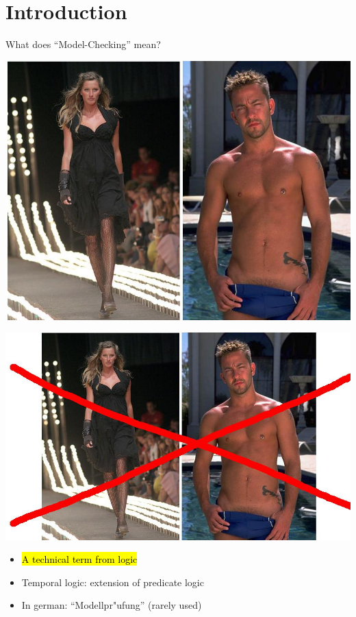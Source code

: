 
\section{Introduction}

\begin{frame}{What does ``Model-Checking'' mean?}
 {
  \centerline{\includegraphics[width=.8\textwidth]{content/chapter_model_checking/model_checking/images/models}}
}

 {
  \centerline{\includegraphics[width=\textwidth]{content/chapter_model_checking/model_checking/images/models1}}
}

 {
  \begin{itemize}
    \item \hl{A technical term from logic}
    \item Temporal logic: extension of predicate logic
    \item In german: ``Modellpr"ufung'' (rarely used)
  \end{itemize}
}
\end{frame}

